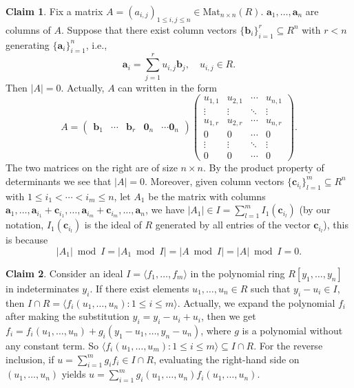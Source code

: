 \documentclass[a4paper, 11pt]{amsart}
\newcommand{\ideala}[1]{\langle{#1}\rangle}
\newcommand{\td}[1]{\bm{#1}}
\newcommand{\tx}[1]{\text{#1}}
\theoremstyle{definition}
\newtheorem{claim}{Claim}
\theoremstyle{definition}
\begin{document}
	
	\begin{claim}\label{clm:det}
		Fix a matrix $A=(a_{i,j})_{1\leq i,j\leq n}\in\tx{Mat}_{n\times n}(R)$. $\td{a}_1,\dots,\td{a}_n$ are columns of $A$. Suppose that there exist column vectors $\{\td{b}_i\}_{i=1}^r\subseteq R^n$ with $r<n$ generating $\{\td{a}_i\}_{i=1}^n$, i.e.,
		\begin{equation*}
			\td{a}_i=\sum^r_{j=1}u_{i,j}\td{b}_j,\quad u_{i,j}\in R.
		\end{equation*}
		Then $|A|=0$. Actually, $A$ can written in the form
		\begin{equation*}
			A=\begin{pmatrix}
				\td{b}_1&\cdots&\td{b}_r&\td{0}_n&\cdots\td{0}_n
			\end{pmatrix}\begin{pmatrix}
				u_{1,1}&u_{2,1}&\cdots&u_{n,1}\\
				\vdots&\vdots&\ddots&\vdots\\
				u_{1,r}&u_{2,r}&\cdots&u_{n,r}\\
				0&0&\cdots&0\\
				\vdots&\vdots&\ddots&\vdots\\
				0&0&\cdots&0
			\end{pmatrix}.
		\end{equation*}
		The two matrices on the right are of size $n\times n$. By the product property of determinants we see that $|A|=0$. Moreover, given column vectors $\{\td{c}_{i_l}\}_{l=1}^m\subseteq R^n$ with $1\leq i_1<\cdots<i_m\leq n$, let $A_1$ be the matrix with columns $\td{a}_1,\dots,\td{a}_{i_1}+\td{c}_{i_1},\dots,\td{a}_{i_m}+\td{c}_{i_m},\dots,\td{a}_n$, we have $|A_1|\in I=\sum^m_{l=1}I_1(\td{c}_{i_l})$ (by our notation, $I_1(\td{c}_{i_l})$ is the ideal of $R$ generated by all entries of the vector $\td{c}_{i_l}$), this is because
		\begin{equation*}
			|A_1|\bmod I=|A_1\bmod I|=|A\bmod I|=|A|\bmod I=0.
		\end{equation*}
	\end{claim}
	
	\begin{claim}\label{clm:I cap R}
		Consider an ideal $I=\ideala{f_1,\dots,f_m}$ in the polynomial ring $R[y_1,\dots,y_n]$ in indeterminates $y_i$. If there exist elements $u_1,\dots,u_n\in R$ such that $y_i-u_i\in I$, then $I\cap R=\ideala{f_i(u_1,\dots,u_n):1\leq i\leq m}$. Actually, we expand the polynomial $f_i$ after making the substitution $y_i=y_i-u_i+u_i$, then we get $f_i=f_i(u_1,\dots,u_n)+g_i(y_1-u_1,\dots,y_n-u_n)$, where $g$ is a polynomial without any constant term. So $\ideala{f_i(u_1,\dots,u_m):1\leq i\leq m}\subseteq I\cap R$. For the reverse inclusion, if $u=\sum^m_{i=1}g_if_i\in I\cap R$, evaluating the right-hand side on $(u_1,\dots,u_n)$ yields $u=\sum^m_{i=1}g_i(u_1,\dots,u_n)f_i(u_1,\dots,u_n)$.
	\end{claim}
	
\end{document}
